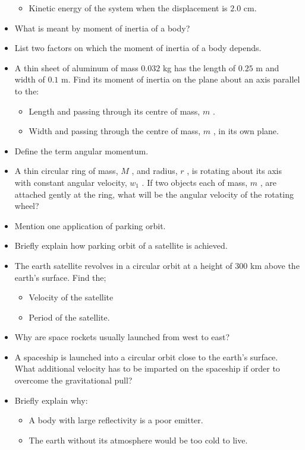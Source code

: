 \documentclass{article}
\begin{document}
\begin{itemize}
\begin{itemize}
\item  Kinetic energy of the system when the displacement is $ 2.0$ cm.
\end{itemize}
\item What is meant by moment of inertia of a body?
\item List two factors on which the moment of inertia of a body depends. 
\item A thin sheet of aluminum of mass $ 0.032$ kg has the length of $ 0.25$ m and width of $ 0.1$ m. Find its moment of inertia on the plane about an axis parallel to the:
 \begin{itemize}
\item Length and passing through its centre of mass, $ m$ .
\item Width and passing through the centre of mass, $ m$ , in its own plane.
\end{itemize}
\item Define the term angular momentum.
\item A thin circular ring of mass, $ M$ , and radius, $ r$ , is rotating about its axis with constant angular velocity, $ w_{1}$ .  If two objects each of mass, $ m$ , are attached gently at the ring, what will be the angular velocity of the rotating wheel?
\item Mention one application of parking orbit.
\item Briefly explain how parking orbit of a satellite is achieved.
\item The earth satellite revolves in a circular orbit at a height of $ 300$ km above the earth’s surface.  Find the; 
 \begin{itemize}
\item Velocity of the satellite
\item Period of the satellite.
\end{itemize}
\item Why are space rockets usually launched from west to east?
\item A spaceship is launched into a circular orbit close to the earth’s surface.  What additional velocity has to be imparted on the spaceship if order to overcome the gravitational pull?
\item Briefly explain why: 
 \begin{itemize}
\item A body with large reflectivity is a poor emitter. 
\item The earth without its atmosphere would be too cold to live.
\end{itemize}

\end{itemize}
\end{document}

